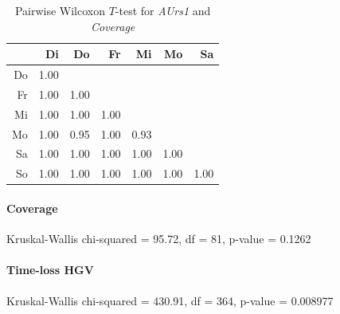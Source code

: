 \begin{table}[ht]
	\small
	\centering
	\begin{tabular}{rrrrrrr}
		\hline
	& Di & Do & Fr & Mi & Mo & Sa \\ 
		\hline
	Do & 1.00 &  &  &  &  &  \\ 
		Fr & 1.00 & 1.00 &  &  &  &  \\ 
		Mi & 1.00 & 1.00 & 1.00 &  &  &  \\ 
		Mo & 1.00 & 0.95 & 1.00 & 0.93 &  &  \\ 
		Sa & 1.00 & 1.00 & 1.00 & 1.00 & 1.00 &  \\ 
		So & 1.00 & 1.00 & 1.00 & 1.00 & 1.00 & 1.00 \\ 
		\hline
	  \end{tabular}
    \caption{Pairwise Wilcoxon $T$-test for \textit{AUrs1} and \textit{Coverage}}
    \label{tbl:wilcoxon_baysis_effector_AUrs1_Cov}
\end{table}

\paragraph{Coverage}
Kruskal-Wallis chi-squared = 95.72, df = 81, p-value = 0.1262

\paragraph{Time-loss HGV}
Kruskal-Wallis chi-squared = 430.91, df = 364, p-value = 0.008977

